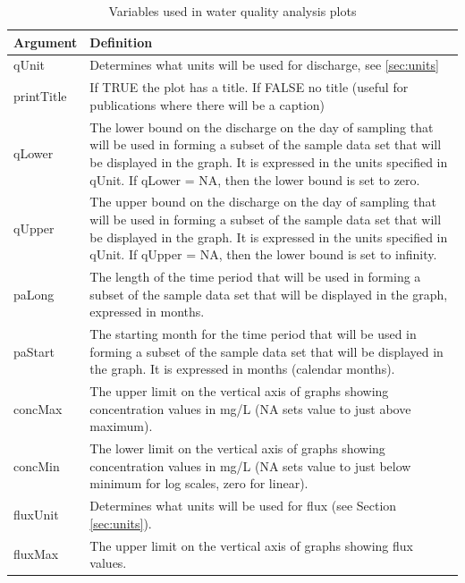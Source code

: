 \documentclass[a4paper,11pt]{article}\usepackage{graphicx, color}
\begin{document}
\begin{table}[ht]
\caption{Variables used in water quality analysis plots  \label{tab:wqVariables}}
\begin{tabularx}{\textwidth}{lX}
\hline
  \textbf{Argument} & \textbf{Definition} \\
\hline
qUnit & Determines what units will be used for discharge, see \ref{sec:units}\\
printTitle & If TRUE the plot has a title.  If FALSE no title (useful for publications where there will be a caption)\\
qLower & The lower bound on the discharge on the day of sampling that will be used in forming a subset of the sample data set that will be displayed in the graph.  It is expressed in the units specified in qUnit.  If qLower = NA, then the lower bound is set to zero.\\
qUpper & The upper bound on the discharge on the day of sampling that will be used in forming a subset of the sample data set that will be displayed in the graph.  It is expressed in the units specified in qUnit.  If qUpper = NA, then the lower bound is set to infinity.\\
paLong & The length of the time period that will be used in forming a subset of the sample data set that will be displayed in the graph, expressed in months. \\ 
paStart & The starting month for the time period that will be used in forming a subset of the sample data set that will be displayed in the graph.  It is expressed in months (calendar months).\\
concMax & The upper limit on the vertical axis of graphs showing concentration values in mg/L (NA sets value to just above maximum).  \\
concMin & The lower limit on the vertical axis of graphs showing concentration values in mg/L (NA sets value to just below minimum for log scales, zero for linear).  \\
fluxUnit & Determines what units will be used for flux (see Section \ref{sec:units}).\\
fluxMax & The upper limit on the vertical axis of graphs showing flux values.  \\
\hline
\end{tabularx}

\end{table}

\FloatBarrier
\clearpage


\end{document}
